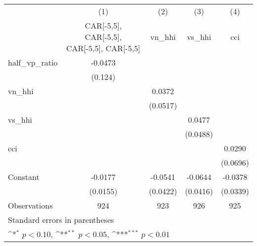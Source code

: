 {
\def\sym#1{\ifmmode^{#1}\else\(^{#1}\)\fi}
\begin{tabular}{l*{4}{c}}
\hline\hline
                    &\multicolumn{1}{c}{(1)}&\multicolumn{1}{c}{(2)}&\multicolumn{1}{c}{(3)}&\multicolumn{1}{c}{(4)}\\
                    &\multicolumn{1}{c}{CAR[-5,5], CAR[-5,5], CAR[-5,5], CAR[-5,5]}&\multicolumn{1}{c}{vn\_hhi}&\multicolumn{1}{c}{vs\_hhi}&\multicolumn{1}{c}{cci}\\
\hline
half\_vp\_ratio       &     -0.0473         &                     &                     &                     \\
                    &     (0.124)         &                     &                     &                     \\
[1em]
vn\_hhi              &                     &      0.0372         &                     &                     \\
                    &                     &    (0.0517)         &                     &                     \\
[1em]
vs\_hhi              &                     &                     &      0.0477         &                     \\
                    &                     &                     &    (0.0488)         &                     \\
[1em]
cci                 &                     &                     &                     &      0.0290         \\
                    &                     &                     &                     &    (0.0696)         \\
[1em]
Constant            &     -0.0177         &     -0.0541         &     -0.0644         &     -0.0378         \\
                    &    (0.0155)         &    (0.0422)         &    (0.0416)         &    (0.0339)         \\
\hline
Observations        &         924         &         923         &         926         &         925         \\
\hline\hline
\multicolumn{5}{l}{\footnotesize Standard errors in parentheses}\\
\multicolumn{5}{l}{\footnotesize \sym{*} \(p<0.10\), \sym{**} \(p<0.05\), \sym{***} \(p<0.01\)}\\
\end{tabular}
}
